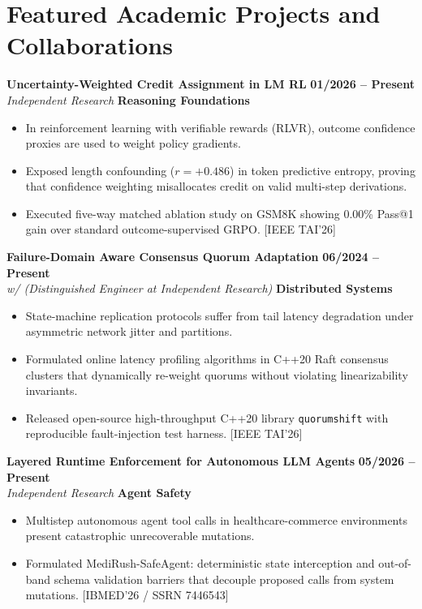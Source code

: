 \documentclass[10pt,letterpaper]{article}
\begin{document}
\section*{Featured Academic Projects and Collaborations}
\textbf{Uncertainty-Weighted Credit Assignment in LM RL} \hfill \textbf{01/2026 -- Present} \\
\textit{Independent Research} \hfill \textcolor{accent}{\textbf{Reasoning Foundations}}
\begin{itemize}
    \item In reinforcement learning with verifiable rewards (RLVR), outcome confidence proxies are used to weight policy gradients.
    \item Exposed length confounding ($r = +0.486$) in token predictive entropy, proving that confidence weighting misallocates credit on valid multi-step derivations.
    \item Executed five-way matched ablation study on GSM8K showing 0.00\% Pass@1 gain over standard outcome-supervised GRPO. [IEEE TAI'26]
\end{itemize}

\vspace{3pt}

\textbf{Failure-Domain Aware Consensus Quorum Adaptation} \hfill \textbf{06/2024 -- Present} \\
\textit{w/  (Distinguished Engineer at Independent Research)} \hfill \textcolor{accent}{\textbf{Distributed Systems}}
\begin{itemize}
    \item State-machine replication protocols suffer from tail latency degradation under asymmetric network jitter and partitions.
    \item Formulated online latency profiling algorithms in C++20 Raft consensus clusters that dynamically re-weight quorums without violating linearizability invariants.
    \item Released open-source high-throughput C++20 library \texttt{quorumshift} with reproducible fault-injection test harness. [IEEE TAI'26]
\end{itemize}

\vspace{3pt}

\textbf{Layered Runtime Enforcement for Autonomous LLM Agents} \hfill \textbf{05/2026 -- Present} \\
\textit{Independent Research} \hfill \textcolor{accent}{\textbf{Agent Safety}}
\begin{itemize}
    \item Multistep autonomous agent tool calls in healthcare-commerce environments present catastrophic unrecoverable mutations.
    \item Formulated MediRush-SafeAgent: deterministic state interception and out-of-band schema validation barriers that decouple proposed calls from system mutations. [IBMED'26 / SSRN 7446543]
\end{itemize}
\end{document}
